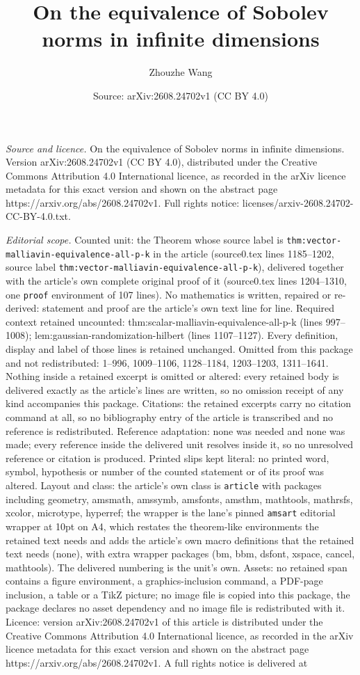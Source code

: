 \documentclass[10pt,a4paper]{amsart}
\title[On the equivalence of Sobolev norms in infinite dimensions]{On the equivalence of Sobolev norms in infinite dimensions}
\author{Zhouzhe Wang}
\date{Source: arXiv:2608.24702v1 (CC BY 4.0)}
\begin{document}
\maketitle

\noindent\emph{Source and licence.} On the equivalence of Sobolev norms in infinite dimensions. Version arXiv:2608.24702v1 (CC BY 4.0), distributed under the Creative Commons Attribution 4.0 International licence, as recorded in the arXiv licence metadata for this exact version and shown on the abstract page https://arxiv.org/abs/2608.24702v1. Full rights notice: licenses/arxiv-2608.24702-CC-BY-4.0.txt.\par\smallskip

\noindent\textit{Editorial scope.} Counted unit: the Theorem whose source label is \texttt{thm:vector-malliavin-equivalence-all-p-k} in the article (source0.tex lines 1185--1202, source label \texttt{thm:vector-malliavin-equivalence-all-p-k}), delivered together with the article's own complete original proof of it (source0.tex lines 1204--1310, one \texttt{proof} environment of 107 lines). No mathematics is written, repaired or re-derived: statement and proof are the article's own text line for line. Required context retained uncounted: thm:scalar-malliavin-equivalence-all-p-k (lines 997--1008); lem:gaussian-randomization-hilbert (lines 1107--1127). Every definition, display and label of those lines is retained unchanged. Omitted from this package and not redistributed: 1--996, 1009--1106, 1128--1184, 1203--1203, 1311--1641. Nothing inside a retained excerpt is omitted or altered: every retained body is delivered exactly as the article's lines are written, so no omission receipt of any kind accompanies this package. Citations: the retained excerpts carry no citation command at all, so no bibliography entry of the article is transcribed and no reference is redistributed. Reference adaptation: none was needed and none was made; every reference inside the delivered unit resolves inside it, so no unresolved reference or citation is produced. Printed slips kept literal: no printed word, symbol, hypothesis or number of the counted statement or of its proof was altered. Layout and class: the article's own class is \texttt{article} with packages including geometry, amsmath, amssymb, amsfonts, amsthm, mathtools, mathrsfs, xcolor, microtype, hyperref; the wrapper is the lane's pinned \texttt{amsart} editorial wrapper at 10pt on A4, which restates the theorem-like environments the retained text needs and adds the article's own macro definitions that the retained text needs (none), with extra wrapper packages (bm, bbm, dsfont, xspace, cancel, mathtools). The delivered numbering is the unit's own. Assets: no retained span contains a figure environment, a graphics-inclusion command, a PDF-page inclusion, a table or a TikZ picture; no image file is copied into this package, the package declares no asset dependency and no image file is redistributed with it. Licence: version arXiv:2608.24702v1 of this article is distributed under the Creative Commons Attribution 4.0 International licence, as recorded in the arXiv licence metadata for this exact version and shown on the abstract page https://arxiv.org/abs/2608.24702v1. A full rights notice is delivered at 
\end{document}
